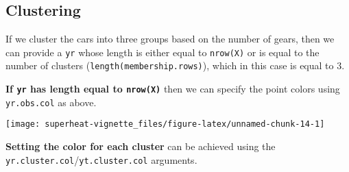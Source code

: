 \documentclass[]{book}
\newenvironment{Shaded}{\begin{snugshade}}{\end{snugshade}}
\newcommand{\KeywordTok}[1]{\textcolor[rgb]{0.13,0.29,0.53}{\textbf{{#1}}}}
\newcommand{\DataTypeTok}[1]{\textcolor[rgb]{0.13,0.29,0.53}{{#1}}}
\newcommand{\DecValTok}[1]{\textcolor[rgb]{0.00,0.00,0.81}{{#1}}}
\newcommand{\FloatTok}[1]{\textcolor[rgb]{0.00,0.00,0.81}{{#1}}}
\newcommand{\StringTok}[1]{\textcolor[rgb]{0.31,0.60,0.02}{{#1}}}
\newcommand{\CommentTok}[1]{\textcolor[rgb]{0.56,0.35,0.01}{\textit{{#1}}}}
\newcommand{\NormalTok}[1]{{#1}}
\theoremstyle{definition}
\theoremstyle{definition}
\theoremstyle{remark}
\begin{document}
\subsection{Clustering}\label{clustering-1}

If we cluster the cars into three groups based on the number of gears,
then we can provide a \texttt{yr} whose length is either equal to
\texttt{nrow(X)} or is equal to the number of clusters
(\texttt{length(membership.rows)}), which in this case is equal to 3.

\textbf{If \texttt{yr} has length equal to \texttt{nrow(X)}} then we can
specify the point colors using \texttt{yr.obs.col} as above.

\begin{Shaded}
\end{Shaded}

\begin{center}\texttt{[image: superheat-vignette\_files/figure-latex/unnamed-chunk-14-1]} \end{center}

\textbf{Setting the color for each cluster} can be achieved using the
\texttt{yr.cluster.col}/\texttt{yt.cluster.col} arguments.
\end{document}
